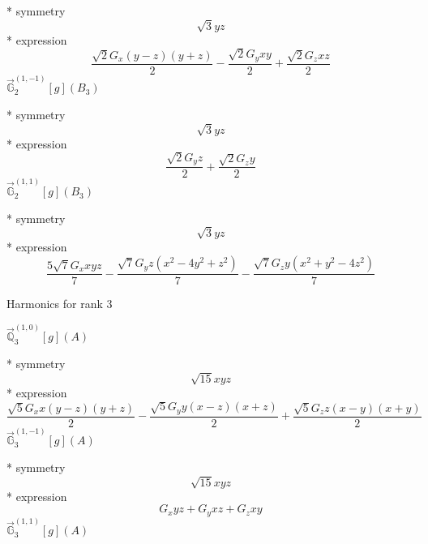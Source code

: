 \documentclass[fleqn,8pt]{jsarticle}
\begin{document}
\noindent\quad ** symmetry
\begin{dmath*}
\sqrt{3} y z
\end{dmath*}
\noindent\quad ** expression
\begin{dmath*}
\frac{\sqrt{2} G_{x} \left(y - z\right) \left(y + z\right)}{2} - \frac{\sqrt{2} G_{y} x y}{2} + \frac{\sqrt{2} G_{z} x z}{2}
\end{dmath*}
\noindent\quad $\vec{\mathbb{G}}_{2}^{(1,-1)}[g](B_{3})$

\noindent\quad ** symmetry
\begin{dmath*}
\sqrt{3} y z
\end{dmath*}
\noindent\quad ** expression
\begin{dmath*}
\frac{\sqrt{2} G_{y} z}{2} + \frac{\sqrt{2} G_{z} y}{2}
\end{dmath*}
\noindent\quad $\vec{\mathbb{G}}_{2}^{(1,1)}[g](B_{3})$

\noindent\quad ** symmetry
\begin{dmath*}
\sqrt{3} y z
\end{dmath*}
\noindent\quad ** expression
\begin{dmath*}
\frac{5 \sqrt{7} G_{x} x y z}{7} - \frac{\sqrt{7} G_{y} z \left(x^{2} - 4 y^{2} + z^{2}\right)}{7} - \frac{\sqrt{7} G_{z} y \left(x^{2} + y^{2} - 4 z^{2}\right)}{7}
\end{dmath*}

\noindent * Harmonics for rank 3

\noindent\quad $\vec{\mathbb{Q}}_{3}^{(1,0)}[g](A)$

\noindent\quad ** symmetry
\begin{dmath*}
\sqrt{15} x y z
\end{dmath*}
\noindent\quad ** expression
\begin{dmath*}
\frac{\sqrt{5} G_{x} x \left(y - z\right) \left(y + z\right)}{2} - \frac{\sqrt{5} G_{y} y \left(x - z\right) \left(x + z\right)}{2} + \frac{\sqrt{5} G_{z} z \left(x - y\right) \left(x + y\right)}{2}
\end{dmath*}
\noindent\quad $\vec{\mathbb{G}}_{3}^{(1,-1)}[g](A)$

\noindent\quad ** symmetry
\begin{dmath*}
\sqrt{15} x y z
\end{dmath*}
\noindent\quad ** expression
\begin{dmath*}
G_{x} y z + G_{y} x z + G_{z} x y
\end{dmath*}
\noindent\quad $\vec{\mathbb{G}}_{3}^{(1,1)}[g](A)$
\end{document}
